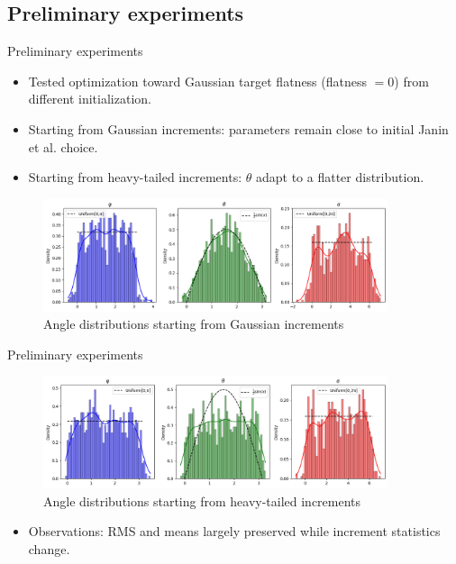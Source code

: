 \documentclass[11pt]{beamer}
\begin{document}
\subsection{Preliminary experiments}
\begin{frame}{Preliminary experiments}
  \begin{itemize}
    \item Tested optimization toward Gaussian target flatness (flatness $=0$) from different initialization.
    \item Starting from Gaussian increments: parameters remain close to initial Janin et al. choice.
    \item Starting from heavy-tailed increments: $\theta$ adapt to a flatter distribution.
  \end{itemize}
  \begin{figure}
    \centering
    \includegraphics[width=0.9\textwidth]{illustrations/StartGaussian.png}
    \caption{Angle distributions starting from Gaussian increments}
  \end{figure}
\end{frame}

\begin{frame}{Preliminary experiments}
  \begin{figure}
    \centering
    \includegraphics[width=0.9\textwidth]{illustrations/StartHeavyTail.png}
    \caption{Angle distributions starting from heavy-tailed increments}
  \end{figure}
  \begin{itemize}
    \item Observations: RMS and means largely preserved while increment statistics change.
  \end{itemize}
\end{frame}
\end{document}
